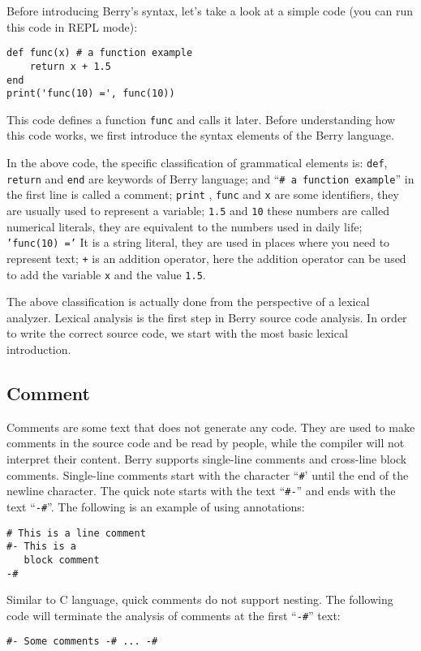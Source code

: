 Before introducing Berry's syntax, let's take a look at a simple code (you can run this code in REPL mode):
\begin{lstlisting}[language=berry]
def func(x) # a function example
    return x + 1.5
end
print('func(10) =', func(10))
\end{lstlisting}

This code defines a function \texttt{func} and calls it later. Before understanding how this code works, we first introduce the syntax elements of the Berry language.

In the above code, the specific classification of grammatical elements is: \texttt{def}, \texttt{return} and \texttt{end} are keywords of Berry language; and ``\texttt{\# a function example}'' in the first line is called a comment; \texttt{print} , \texttt{func} and \texttt{x} are some identifiers, they are usually used to represent a variable; \texttt{1.5} and \texttt{10} these numbers are called numerical literals, they are equivalent to the numbers used in daily life; \texttt{'func(10) ='} It is a string literal, they are used in places where you need to represent text; \texttt{+} is an addition operator, here the addition operator can be used to add the variable \texttt{x} and the value \texttt{1.5}.

The above classification is actually done from the perspective of a lexical analyzer. Lexical analysis is the first step in Berry source code analysis. In order to write the correct source code, we start with the most basic lexical introduction.

\subsection{Comment}

Comments are some text that does not generate any code. They are used to make comments in the source code and be read by people, while the compiler will not interpret their content. Berry supports single-line comments and cross-line block comments. Single-line comments start with the character ``\texttt{\#}' until the end of the newline character. The quick note starts with the text ``\texttt{\#-}'' and ends with the text ``\texttt{-\#}''. The following is an example of using annotations:
\begin{lstlisting}[language=berry, numbers=none]
# This is a line comment
#- This is a
   block comment
-#
\end{lstlisting}Similar to C language, quick comments do not support nesting. The following code will terminate the analysis of comments at the first ``\texttt{-\#}'' text:
\begin{lstlisting}[language=berry, numbers=none]
#- Some comments -# ... -#
\end{lstlisting}

